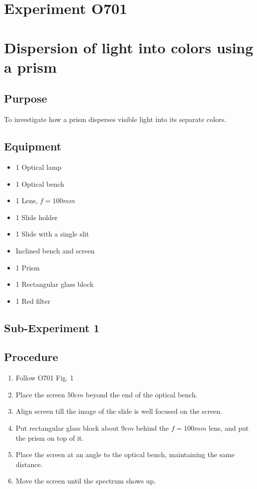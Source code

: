 \documentclass[12pt]{article}
\begin{document}
\newpage

\section*{Experiment O701}

\section*{Dispersion of light into colors using a prism}

\subsection*{Purpose}

To investigate how a prism disperses visible light into its separate colors.

\subsection*{Equipment}

\begin{itemize}
\item 1 Optical lamp
\item 1 Optical bench
\item 1 Lens, $f=100 mm$
\item 1 Slide holder
\item 1 Slide with a single slit
\item Inclined bench and screen
\item 1 Prism
\item 1 Rectangular glass block
\item 1 Red filter
\end{itemize}


\subsection*{Sub-Experiment 1}

\subsection*{Procedure}

\begin{enumerate}
\item Follow O701 Fig. 1
\item Place the screen $50 cm$ beyond the end of the optical bench.
\item Align screen till the image of the slide is well focused on the screen.
\item Put rectangular glass block about $9cm$ behind the $f=100mm$ lens, and put the prism on top of it.
\item Place the screen at an angle to the optical bench, maintaining the same distance.
\item Move the screen until the spectrum shows up.
\end{enumerate}
\end{document}
